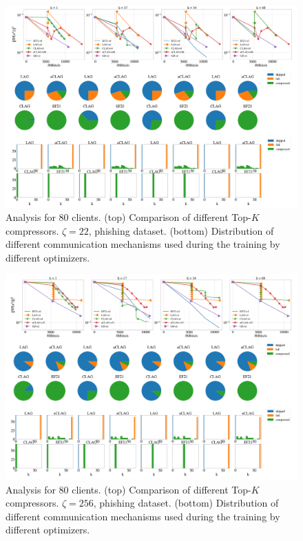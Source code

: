 \documentclass[nohyperref]{article}
\theoremstyle{plain}
\theoremstyle{definition}
\theoremstyle{remark}
\begin{document}
\begin{figure}[!h]
	\centering
	\includegraphics[width=\textwidth]{plots/adaptive/new_7.png}
	\caption{Analysis for 80 clients. (top) Comparison of different  Top-$K$ compressors. $\zeta = 22$, phishing dataset. (bottom) Distribution  of different communication mechanisms used during the training by different optimizers.}
	\label{fig:anna-100-nodes-grads_main}
\end{figure}

\begin{figure}[!h]
	\centering
	\includegraphics[width=\textwidth]{plots/adaptive/new_9.png}
	\caption{Analysis for 80 clients. (top) Comparison of different  Top-$K$ compressors. $\zeta = 256$, phishing dataset. (bottom) Distribution  of different communication mechanisms used during the training by different optimizers.}
	\label{fig:anna-100-nodes-grads_main}
\end{figure}
\end{document}
